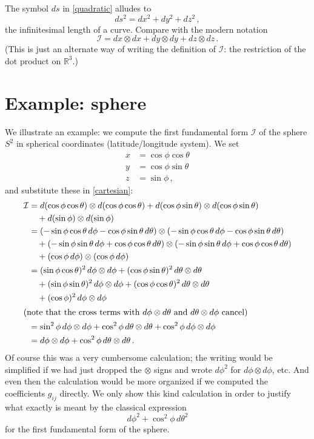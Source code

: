 \documentclass[12pt]{article}
\newcommand{\real}{\mathbb{R}}
\begin{document}
The symbol $ds$ in \eqref{quadratic} alludes
to
\[
ds^2 = dx^2 + dy^2 + dz^2\,,
\]
the infinitesimal length of a curve.  Compare with the modern notation
\begin{equation}\label{cartesian}
\mathcal{I} = dx \otimes dx + dy \otimes dy + dz \otimes dz\,.
\end{equation}
(This is just an alternate way of writing the definition of $\mathcal{I}$:
the restriction of the dot product on $\real^3$.)

\section*{Example: sphere}
We illustrate an example: we compute the first fundamental form $\mathcal{I}$
of the sphere $S^2$ in spherical coordinates (latitude/longitude system).
We set
\begin{align*}
x &= \cos \phi \cos \theta \\
y &= \cos \phi \sin \theta \\
z &= \sin \phi\,,
\end{align*}
and substitute these in \eqref{cartesian}:
\begin{align*}
\mathcal{I} &= d (\cos \phi \cos \theta) \otimes d(\cos \phi \cos \theta)
+ d(\cos \phi \sin \theta) \otimes d(\cos \phi \sin \theta)  \\
&  \quad + d(\sin \phi) \otimes d(\sin \phi) \\
&= (- \sin \phi \cos \theta \, d\phi - \cos \phi \sin \theta \, d\theta)
\otimes
(- \sin \phi \cos \theta \, d\phi - \cos \phi \sin \theta \, d\theta) \\
& \quad + (- \sin \phi \sin \theta \, d\phi + \cos \phi \cos \theta \, d\theta) 
\otimes
(- \sin \phi \sin \theta \, d\phi + \cos \phi \cos \theta \, d\theta) \\
& \quad + (\cos \phi \, d\phi) \otimes (\cos \phi \, d\phi) \\
&= (\sin \phi \cos \theta)^2 \, d\phi \otimes d\phi + (\cos \phi \sin \theta)^2 \, d\theta \otimes d\theta \\
& \quad + (\sin \phi \sin \theta)^2 \, d\phi \otimes d\phi + (\cos \phi \cos \theta)^2 \, d\theta \otimes d\theta  \\
& \quad + (\cos \phi)^2 \, d\phi \otimes d\phi \\
\intertext{(note that the cross terms with $d\phi \otimes d\theta$ and $d\theta \otimes d\phi$ cancel)} 
&= \sin^2 \phi \, d\phi \otimes d\phi  + \cos^2 \phi \, d\theta \otimes d\theta + \cos^2 \phi \, d\phi \otimes d\phi \\
&= d\phi \otimes d\phi + \cos^2 \phi \, d\theta \otimes d\theta\,.
\end{align*}
Of course this was a very cumbersome calculation; the writing would be simplified
if we had just dropped the $\otimes$ signs and wrote $d\phi^2$ for $d\phi \otimes d\phi$, etc.
And even then the calculation would be more organized if we computed 
the coefficients $g_{ij}$ directly.
We only show this kind calculation in order to justify
what exactly
is meant by
the classical expression
\[
d\phi^2 + \cos^2 \phi \, d\theta^2
\]
for the first fundamental form of the sphere.
\end{document}
